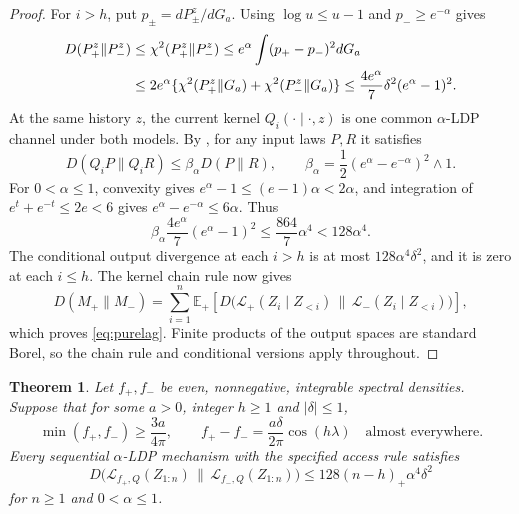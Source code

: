 \documentclass[11pt]{article}
\newtheorem{theorem}{Theorem}
\theoremstyle{remark}
\newcommand{\E}{\mathbb E}
\newcommand{\KL}{D}
\begin{document}
\begin{proof}
For $i>h$, put $p_\pm=dP_\pm^z/dG_a$. Using $\log u\le u-1$ and
$p_-\ge e^{-\alpha}$ gives
\begin{align}\label{eq:predictive-kl}
 \KL(P_+^z\|P_-^z)
 &\le \chi^2(P_+^z\|P_-^z)
 \le e^\alpha\int(p_+-p_-)^2dG_a\notag\\
 &\le2e^\alpha\{\chi^2(P_+^z\|G_a)+\chi^2(P_-^z\|G_a)\}
 \le\frac{4e^\alpha}{7}\delta^2(e^\alpha-1)^2.
\end{align}
At the same history $z$, the current kernel $Q_i(\cdot\mid\cdot,z)$ is
one common $\alpha$-LDP channel under both models. By
\cite[Lemma 3]{IR}, for any input laws $P,R$ it satisfies
\begin{equation}\label{eq:channel-contraction}
 \KL(Q_iP\|Q_iR)\le\beta_\alpha\KL(P\|R),
 \qquad \beta_\alpha=\frac12(e^\alpha-e^{-\alpha})^2\wedge1.
\end{equation}
For $0<\alpha\le1$, convexity gives $e^\alpha-1\le(e-1)\alpha<2\alpha$,
and integration of $e^t+e^{-t}\le2e<6$ gives
$e^\alpha-e^{-\alpha}\le6\alpha$. Thus
\[
 \beta_\alpha\frac{4e^\alpha}{7}(e^\alpha-1)^2
 \le\frac{864}{7}\alpha^4<128\alpha^4.
\]
The conditional output divergence at each $i>h$ is at most
$128\alpha^4\delta^2$, and it is zero at each $i\le h$.
The kernel chain rule \cite[Lemma 14]{IR} now gives
\[
 \KL(M_+\|M_-)
 =\sum_{i=1}^n\E_+\!\left[
    \KL\bigl(\mathcal L_+(Z_i\mid Z_{<i})\,
             \|\,\mathcal L_-(Z_i\mid Z_{<i})\bigr)\right],
\]
which proves \eqref{eq:purelag}. Finite products of the output spaces are
standard Borel, so the chain rule and conditional versions apply throughout.
\end{proof}

\begin{theorem}\label{thm:pair}
Let $f_+,f_-$ be even, nonnegative, integrable spectral densities. Suppose
that for some $a>0$, integer $h\ge1$ and $|\delta|\le1$,
\begin{equation}\label{eq:pair-condition}
 \min(f_+,f_-)\ge\frac{3a}{4\pi},\qquad
 f_+-f_-=\frac{a\delta}{2\pi}\cos(h\lambda)
 \quad\text{almost everywhere}.
\end{equation}
Every sequential $\alpha$-LDP mechanism with the specified access rule
satisfies
\begin{equation}\label{eq:pair-kl}
 \KL\bigl(\mathcal L_{f_+,Q}(Z_{1:n})\,
          \|\,\mathcal L_{f_-,Q}(Z_{1:n})\bigr)
 \le128(n-h)_+\alpha^4\delta^2
\end{equation}
for $n\ge1$ and $0<\alpha\le1$.
\end{theorem}
\end{document}

